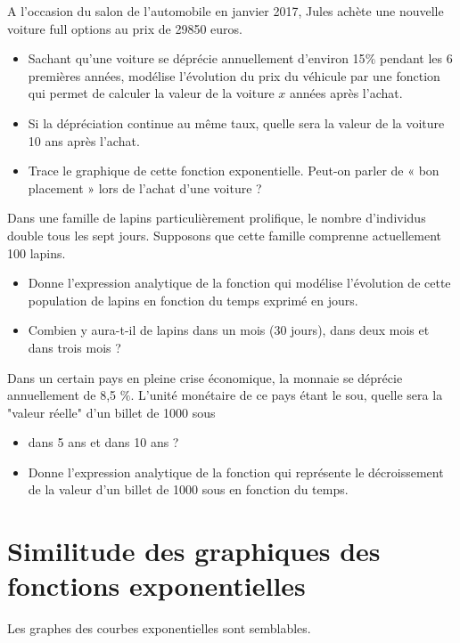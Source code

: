 \documentclass[a4paper,12pt,singlepage]{report}
\begin{document}
\begin{exercice}
A l’occasion du salon de l’automobile en janvier 2017, Jules achète une nouvelle
voiture full options au prix de 29850 euros.
\begin{itemize}
\item Sachant qu’une voiture se déprécie annuellement d’environ 15\(\%\)
pendant les 6 premières années, modélise l’évolution du prix du
véhicule par une fonction qui permet de calculer la valeur de la
voiture \(x\) années après l’achat.
\item Si la dépréciation continue au même taux, quelle sera la valeur de
la voiture 10 ans après l’achat.
\item Trace le graphique de cette fonction exponentielle. Peut-on parler
de « bon placement » lors de l’achat d’une voiture ?
\end{itemize}
\end{exercice}

\begin{exercice}
Dans une famille de lapins particulièrement prolifique, le nombre
d'individus double tous les sept jours. Supposons que cette famille comprenne
actuellement 100 lapins.
\begin{itemize}
\item Donne l’expression analytique de la fonction qui modélise
l’évolution de cette population de lapins en fonction du temps
exprimé en jours.
\item Combien y aura-t-il de lapins dans un mois (30 jours), dans deux
mois et dans trois mois ?
\end{itemize}
\end{exercice}

\begin{exercice}
Dans un certain pays en pleine crise économique, la monnaie se déprécie
annuellement de 8,5 \(\%\). L'unité monétaire de ce pays étant le sou,
quelle sera la "valeur réelle" d'un billet de 1000 sous
\begin{itemize}
\item dans 5 ans et dans 10 ans ?
\item Donne l’expression analytique de la fonction qui représente le
décroissement de la valeur d’un billet de 1000 sous en fonction du temps.
\end{itemize}
\end{exercice}
\newpage
\section{Similitude des graphiques des fonctions exponentielles}
\label{sec:orgcdb179c}
Les graphes des courbes exponentielles sont semblables.
\end{document}

